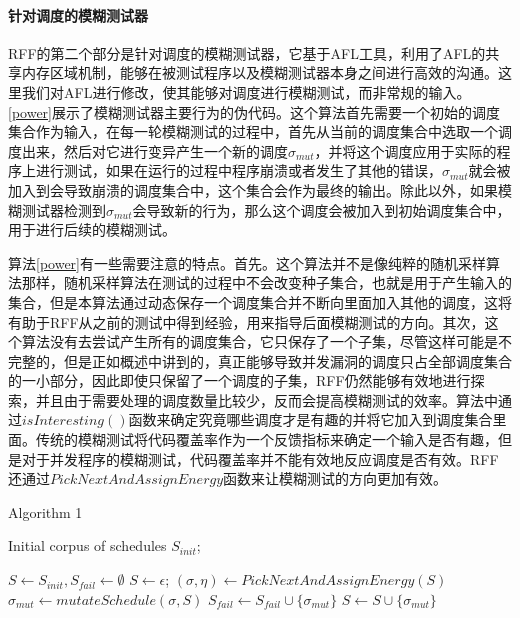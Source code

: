 \paragraph{针对调度的模糊测试器}RFF的第二个部分是针对调度的模糊测试器，它基于AFL工具，利用了AFL的共享内存区域机制，能够在被测试程序以及模糊测试器本身之间进行高效的沟通。这里我们对AFL进行修改，使其能够对调度进行模糊测试，而非常规的输入。\ref{power}展示了模糊测试器主要行为的伪代码。这个算法首先需要一个初始的调度集合作为输入，在每一轮模糊测试的过程中，首先从当前的调度集合中选取一个调度出来，然后对它进行变异产生一个新的调度$\sigma_{mut}$，并将这个调度应用于实际的程序上进行测试，如果在运行的过程中程序崩溃或者发生了其他的错误，$\sigma_{mut}$就会被加入到会导致崩溃的调度集合中，这个集合会作为最终的输出。除此以外，如果模糊测试器检测到$\sigma_{mut}$会导致新的行为，那么这个调度会被加入到初始调度集合中，用于进行后续的模糊测试。

算法\ref{power}有一些需要注意的特点。首先。这个算法并不是像纯粹的随机采样算法那样，随机采样算法在测试的过程中不会改变种子集合，也就是用于产生输入的集合，但是本算法通过动态保存一个调度集合并不断向里面加入其他的调度，这将有助于RFF从之前的测试中得到经验，用来指导后面模糊测试的方向。其次，这个算法没有去尝试产生所有的调度集合，它只保存了一个子集，尽管这样可能是不完整的，但是正如概述中讲到的，真正能够导致并发漏洞的调度只占全部调度集合的一小部分，因此即使只保留了一个调度的子集，RFF仍然能够有效地进行探索，并且由于需要处理的调度数量比较少，反而会提高模糊测试的效率。算法中通过$isInteresting()$函数来确定究竟哪些调度才是有趣的并将它加入到调度集合里面。传统的模糊测试将代码覆盖率作为一个反馈指标来确定一个输入是否有趣，但是对于并发程序的模糊测试，代码覆盖率并不能有效地反应调度是否有效。RFF还通过$PickNextAndAssignEnergy$函数来让模糊测试的方向更加有效。

\begin{algorithm}[!ht]
\caption{Algorithm 1}
\label{power}
\begin{algorithmic}[1]
    \REQUIRE  Initial corpus of schedules $S_{init}$; %
    
    \STATE $S \leftarrow S_{init}, S_{fail} \leftarrow \emptyset$
     \STATE $S \leftarrow {\epsilon}$;
    \ENDIF
    \REPEAT
        \STATE $(\sigma, \eta) \leftarrow PickNextAndAssignEnergy(S)$
            \STATE $\sigma_{mut} \leftarrow mutateSchedule(\sigma, S)$
             \STATE $S_{fail} \leftarrow S_{fail} \cup \{\sigma_{mut}\}$
            \ENDIF
             \STATE $S \leftarrow S \cup \{\sigma_{mut}\}$
            \ENDIF
        \ENDFOR
\end{algorithmic}  
\end{algorithm}

